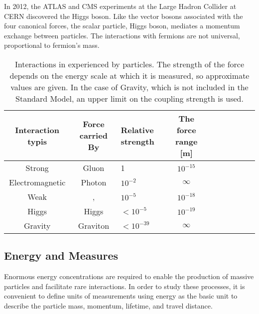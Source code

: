 In 2012, the ATLAS and CMS experiments at the Large Hadron Collider at CERN discovered the Higgs boson. Like the vector bosons associated with the four canonical forces, the scalar particle, Higgs boson, mediates a momentum exchange between particles. The interactions with fermions are not universal, proportional to fermion's mass.

\begin{table}[htp]
\begin{center}
\caption{Interactions in experienced by particles. The strength of the force depends on the energy scale at which it is measured, so approximate values are given. In the case of Gravity, which is not included in the Standard Model, an upper limit on the coupling strength is used. \cite{robinson}}
{\footnotesize
\begin{tabular}{c c l c c c c c c c}
\toprule
Interaction typis      & Force carried By &  Relative strength   & The force range [m]  \\
\midrule
Strong           & Gluon      &  1           & $10^{-15}$ \\
Electromagnetic  & Photon     &  $10^{-2}$   & $\infty$   \\
Weak             & \W, \Z     &  $10^{-5}$   & $10^{-18}$ \\
Higgs            & Higgs      &  $<10^{-5}$  & $10^{-19}$ \\
Gravity          & Graviton   &  $<10^{-39}$ & $\infty$   \\
\bottomrule
\end{tabular}
}
\label{tab:forces}
\end{center}
\end{table}

\subsection{Energy and Measures}

Enormous energy concentrations are required to enable the production of massive particles and facilitate rare interactions.
In order to study these processes, it is convenient to define units of measurements using energy as the basic unit to describe the particle mass, momentum, lifetime, and travel distance.

